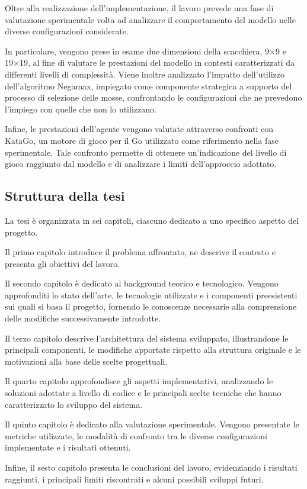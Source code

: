 Oltre alla realizzazione dell'implementazione, il lavoro prevede una fase di valutazione sperimentale volta ad analizzare il comportamento del modello nelle diverse configurazioni considerate.

In particolare, vengono prese in esame due dimensioni della scacchiera, 9×9 e 19×19, al fine di valutare le prestazioni del modello in contesti caratterizzati da differenti livelli di complessità. Viene inoltre analizzato l'impatto dell'utilizzo dell'algoritmo Negamax, impiegato come componente strategica a supporto del processo di selezione delle mosse, confrontando le configurazioni che ne prevedono l'impiego con quelle che non lo utilizzano.

Infine, le prestazioni dell'agente vengono valutate attraverso confronti con KataGo, un motore di gioco per il Go utilizzato come riferimento nella fase sperimentale. Tale confronto permette di ottenere un'indicazione del livello di gioco raggiunto dal modello e di analizzare i limiti dell'approccio adottato.

\subsection{Struttura della tesi}

La tesi è organizzata in sei capitoli, ciascuno dedicato a uno specifico aspetto del progetto.

Il primo capitolo introduce il problema affrontato, ne descrive il contesto e presenta gli obiettivi del lavoro.

Il secondo capitolo è dedicato al background teorico e tecnologico. Vengono approfonditi lo stato dell'arte, le tecnologie utilizzate e i componenti preesistenti sui quali si basa il progetto, fornendo le conoscenze necessarie alla comprensione delle modifiche successivamente introdotte.

Il terzo capitolo descrive l'architettura del sistema sviluppato, illustrandone le principali componenti, le modifiche apportate rispetto alla struttura originale e le motivazioni alla base delle scelte progettuali.

Il quarto capitolo approfondisce gli aspetti implementativi, analizzando le soluzioni adottate a livello di codice e le principali scelte tecniche che hanno caratterizzato lo sviluppo del sistema.

Il quinto capitolo è dedicato alla valutazione sperimentale. Vengono presentate le metriche utilizzate, le modalità di confronto tra le diverse configurazioni implementate e i risultati ottenuti.

Infine, il sesto capitolo presenta le conclusioni del lavoro, evidenziando i risultati raggiunti, i principali limiti riscontrati e alcuni possibili sviluppi futuri.
